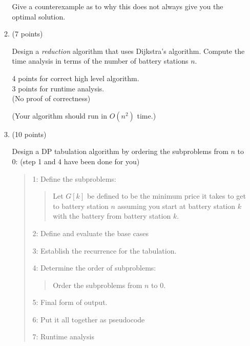 \documentclass[10pt,letterpaper,unboxed,cm]{article}
\begin{document}
\begin{enumerate}
\begin{enumerate}
Give a counterexample as to why this does not always give you the optimal solution.

\item (7 points)

Design a \emph{reduction} algorithm that uses Dijkstra's algorithm.
Compute the time analysis in terms of the number of battery stations $n$.

4 points for correct high level algorithm.\\
3 points for runtime analysis.\\
(No proof of correctness)

(Your algorithm should run in $O(n^2)$ time.)



\item (10 points)

Design a DP tabulation algorithm by ordering the subproblems from $n$ to $0$: (step 1 and 4 have been done for you)

\begin{quote}
1: Define the subproblems:
\begin{quote}
Let $G[k]$ be defined to be the minimum price it takes to get to battery station $n$ assuming you start at battery station $k$ with the battery from battery station $k$.
\end{quote}

2: Define and evaluate the base cases

3: Establish the recurrence for the tabulation.

4: Determine the order of subproblems:
\begin{quote}
Order the subproblems from $n$ to $0$.
\end{quote}

5: Final form of output.

6: Put it all together as pseudocode

7: Runtime analysis


\end{quote}
\end{enumerate}


\end{enumerate}
\end{document}
